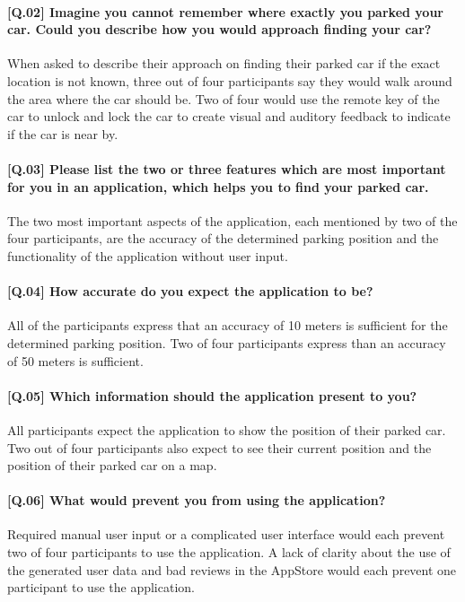 \paragraph{[Q.02] Imagine you cannot remember where exactly you parked your car. Could you describe how you would approach finding your car?}
When asked to describe their approach on finding their parked car if the exact location is not known, three out of four participants say they would walk around the area where the car should be. Two of four would use the remote key of the car to unlock and lock the car to create visual and auditory feedback to indicate if the car is near by.

\paragraph{[Q.03] Please list the two or three features which are most important for you in an application, which helps you to find your parked car.}
The two most important aspects of the application, each mentioned by two of the four participants, are the accuracy of the determined parking position and the functionality of the application without user input.

\paragraph{[Q.04] How accurate do you expect the application to be?}
All of the participants express that an accuracy of 10 meters is sufficient for the determined parking position. Two of four participants express than an accuracy of 50 meters is sufficient.

\paragraph{[Q.05] Which information should the application present to you?}
All participants expect the application to show the position of their parked car. Two out of four participants also expect to see their current position and the position of their parked car on a map. 

\paragraph{[Q.06] What would prevent you from using the application?}
Required manual user input or a complicated user interface would each prevent two of four participants to use the application. A lack of clarity about the use of the generated user data and bad reviews in the AppStore would each prevent one participant to use the application.

